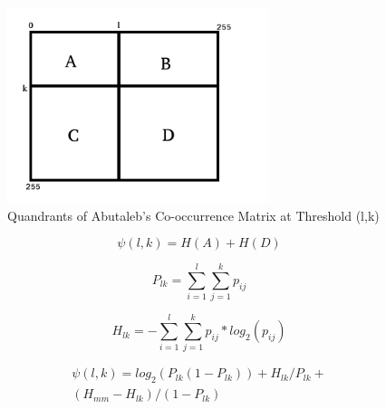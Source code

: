 \documentclass[journal]{IEEEtran}
\begin{document}
\begin{figure}
\centering
\includegraphics[width=3in]{./abutaleb.png}
\caption{Quandrants of Abutaleb's Co-occurrence Matrix at Threshold (l,k)}
\label{fig:abutaleb}
\end{figure}

\begin{equation}
\label{eq:asim}
\psi(l,k) = H(A) + H(D)
\end{equation}

\begin{equation}
P_{lk} = \sum_{i=1}^{l} \sum_{j=1}^{k} p_{ij}
\end{equation}

\begin{equation}
H_{lk} = - \sum_{i=1}^{l} \sum_{j=1}^{k} p_{ij} * log_2(p_{ij})
\end{equation}

\begin{multline}
\label{eq:aobj}
\psi(l,k) = log_2(P_{lk}(1-P_{lk})) + H_{lk}/P_{lk} + \\(H_{mm} - H_{lk}) / (1-P_{lk})
\end{multline}
\end{document}
